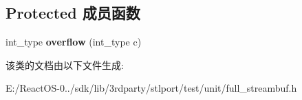 \subsection*{Protected 成员函数}
\begin{DoxyCompactItemize}
\item 
\mbox{\label{classfull__streambuf_adda348b01e1aa912f227431b20a171f7}} 
int\+\_\+type {\bfseries overflow} (int\+\_\+type c)
\end{DoxyCompactItemize}


该类的文档由以下文件生成\+:\begin{DoxyCompactItemize}
\item 
E\+:/\+React\+O\+S-\/0../sdk/lib/3rdparty/stlport/test/unit/full\+\_\+streambuf.\+h\end{DoxyCompactItemize}
